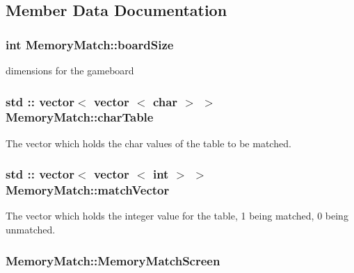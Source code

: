 \subsection{Member Data Documentation}
\hypertarget{classMemoryMatch_aae0a9e51558d70e671fa64aa246de499}{
\subsubsection[{board\-Size}]{\setlength{\rightskip}{0pt plus 5cm}int Memory\-Match\-::board\-Size\hspace{0.3cm}{\ttfamily [private]}}}\label{classMemoryMatch_aae0a9e51558d70e671fa64aa246de499}


dimensions for the gameboard 

\hypertarget{classMemoryMatch_a06ea18368c12d6b067ff18b389ba86c4}{
\subsubsection[{char\-Table}]{\setlength{\rightskip}{0pt plus 5cm}std \-:: vector$<$ vector $<$ char $>$ $>$ Memory\-Match\-::char\-Table\hspace{0.3cm}{\ttfamily [private]}}}\label{classMemoryMatch_a06ea18368c12d6b067ff18b389ba86c4}


The vector which holds the char values of the table to be matched. 

\hypertarget{classMemoryMatch_a4e49279d32294d1f464751956868b7aa}{
\subsubsection[{match\-Vector}]{\setlength{\rightskip}{0pt plus 5cm}std \-:: vector$<$ vector $<$ int $>$ $>$ Memory\-Match\-::match\-Vector\hspace{0.3cm}{\ttfamily [private]}}}\label{classMemoryMatch_a4e49279d32294d1f464751956868b7aa}
The vector which holds the integer value for the table, 1 being matched, 0 being unmatched. \hypertarget{classMemoryMatch_a78399975fec5fea7b2102449a4536fcd}{
\subsubsection[{Memory\-Match\-Screen}]{ Memory\-Match\-::\-Memory\-Match\-Screen\hspace{0.3cm}{\ttfamily [private]}}}\label{classMemoryMatch_a78399975fec5fea7b2102449a4536fcd}


